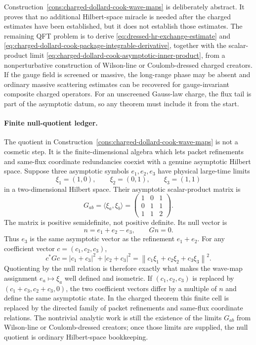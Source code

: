 Construction~\ref{cons:charged-dollard-cook-wave-maps} is deliberately
abstract.  It proves that no additional Hilbert-space miracle is needed after
the charged estimates have been established, but it does not establish those
estimates.  The remaining QFT problem is to derive
\eqref{eq:dressed-hr-exchange-estimate} and
\eqref{eq:charged-dollard-cook-package-integrable-derivative}, together with
the scalar-product limit
\eqref{eq:charged-dollard-cook-asymptotic-inner-product}, from a
nonperturbative construction of Wilson-line or Coulomb-dressed charged
creators.  If the gauge field is screened or massive, the long-range phase
may be absent and ordinary massive scattering estimates can be recovered for
gauge-invariant composite charged operators.  For an unscreened Gauss-law
charge, the flux tail is part of the asymptotic datum, so any theorem must
include it from the start.

\paragraph{Finite null-quotient ledger.}
The quotient in Construction~\ref{cons:charged-dollard-cook-wave-maps} is not
a cosmetic step.  It is the finite-dimensional algebra which lets packet
refinements and same-flux coordinate redundancies coexist with a genuine
asymptotic Hilbert space.  Suppose three asymptotic symbols \(e_1,e_2,e_3\)
have physical large-time limits
\[
  \xi_1=(1,0),\qquad
  \xi_2=(0,1),\qquad
  \xi_3=(1,1)
\]
in a two-dimensional Hilbert space.  Their asymptotic scalar-product matrix is
\begin{equation}
  G_{ab}=\langle \xi_a,\xi_b\rangle
  =
  \begin{pmatrix}
    1&0&1\\
    0&1&1\\
    1&1&2
  \end{pmatrix}.
  \label{eq:charged-asymptotic-gram-finite-cell}
\end{equation}
The matrix is positive semidefinite, not positive definite.  Its null vector
is
\begin{equation}
  n=e_1+e_2-e_3,
  \qquad
  G n=0 .
  \label{eq:charged-asymptotic-null-relation-cell}
\end{equation}
Thus \(e_3\) is the same asymptotic vector as the refinement \(e_1+e_2\).
For any coefficient vector \(c=(c_1,c_2,c_3)\),
\[
  c^*Gc
  =
  |c_1+c_3|^2+|c_2+c_3|^2
  =
  \left\|
    c_1\xi_1+c_2\xi_2+c_3\xi_3
  \right\|^2 .
\]
Quotienting by the null relation is therefore exactly what makes the
wave-map assignment \(e_a\mapsto\xi_a\) well defined and isometric.  If
\((c_1,c_2,c_3)\) is replaced by
\((c_1+c_3,c_2+c_3,0)\), the two coefficient vectors differ by a multiple of
\(n\) and define the same asymptotic state.  In the charged theorem this
finite cell is replaced by the directed family of packet refinements and
same-flux coordinate relations.  The nontrivial analytic work is still the
existence of the limits \(G_{ab}\) from Wilson-line or Coulomb-dressed
creators; once those limits are supplied, the null quotient is ordinary
Hilbert-space bookkeeping.

